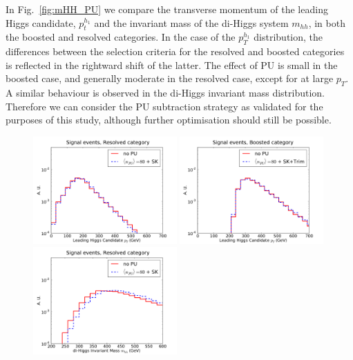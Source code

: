 In Fig.~\ref{fig:mHH_PU}
we compare the transverse momentum of the leading Higgs
candidate, $p_t^{h_1}$ and the invariant mass of the di-Higgs system
$m_{hh}$, in both the boosted and resolved categories.
%
In the case of the $p_T^{h_1}$ distribution, the differences between the selection
criteria for the resolved
and boosted categories is reflected in the rightward shift of the latter.
%
The effect of PU is small in the boosted case, and generally moderate
in the resolved case, except for at large $p_T$.
%
A similar behaviour is observed in the di-Higgs invariant mass distribution.
%
Therefore we can consider the PU subtraction strategy
as validated for the purposes of this study, although
further optimisation should still be possible.

\begin{figure}[t]
  \begin{center}
  \includegraphics[width=0.49\textwidth]{plots/pt_H0_C2_res_comp.pdf}
  \includegraphics[width=0.49\textwidth]{plots/pt_H0_C2_bst_comp.pdf}
  \includegraphics[width=0.49\textwidth]{plots/m_HH_C2_res_comp.pdf}

\end{center}
\end{figure}
